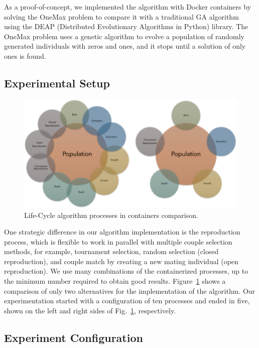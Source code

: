 \documentclass[runningheads]{llncs}
\begin{document}
As a proof-of-concept, we implemented the algorithm with Docker containers by
solving the OneMax problem to compare it with a traditional GA algorithm using
the DEAP (Distributed Evolutionary Algorithms in Python) library. The OneMax
problem uses a genetic algorithm to evolve a population of randomly generated
individuals with zeros and ones, and it stops until a solution of only ones is
found.

\subsection{Experimental Setup}

\begin{figure}
    \includegraphics[width=\textwidth]{img/fig5_processes_containers.pdf}
    \caption{Life-Cycle algorithm processes in containers comparison.} \label{fig5}
    \end{figure}

One strategic difference in our algorithm implementation is the reproduction
process, which is flexible to work in parallel with multiple couple selection
methods, for example, tournament selection, random selection (closed
reproduction), and couple match by creating a new mating individual (open
reproduction). We use many combinations of the containerized processes, up to
the minimum number required to obtain good results. Figure~\ref{fig5} shows a comparison
of only two alternatives for the implementation of the algorithm. Our
experimentation started with a configuration of ten processes and ended in
five, shown on the left and right sides of Fig.~\ref{fig5}, respectively.

\subsection{Experiment Configuration}
\end{document}
